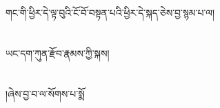 གང་གི་ཕྱིར་དེ་ལྟ་བུའི་ངོ་བོ་བསྟན་པའི་ཕྱིར་དེ་སྐད་ཅེས་བྱ་སྙམ་པ་ལ།\chapter{ }ཡང་དག་ཀུན་རྫོབ་རྣམས་ཀྱི་སྐས།\chapter{ }།ཞེས་བྱ་བ་ལ་སོགས་པ་སྨོ